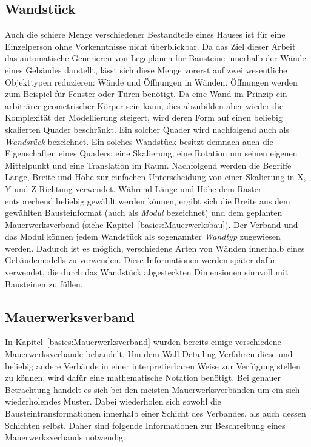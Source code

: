 \subsection{Wandstück}
Auch die schiere Menge verschiedener Bestandteile eines Hauses ist für eine Einzelperson ohne Vorkenntnisse nicht überblickbar.
Da das Ziel dieser Arbeit das automatische Generieren von Legeplänen für Bausteine innerhalb der Wände eines Gebäudes darstellt, lässt sich diese Menge vorerst auf zwei wesentliche Objekttypen reduzieren:
Wände und Öffnungen in Wänden.
Öffnungen werden zum Beispiel für Fenster oder Türen benötigt.
Da eine Wand im Prinzip ein arbiträrer geometrischer Körper sein kann, dies abzubilden aber wieder die Komplexität der Modellierung steigert, wird deren Form auf einen beliebig skalierten Quader beschränkt.
Ein solcher Quader wird nachfolgend auch als \textit{Wandstück} bezeichnet.
Ein solches Wandstück besitzt demnach auch die Eigenschaften eines Quaders: eine Skalierung, eine Rotation um seinen eigenen Mittelpunkt und eine Translation im Raum.
Nachfolgend werden die Begriffe Länge, Breite und Höhe zur einfachen Unterscheidung von einer Skalierung in X, Y und Z Richtung verwendet.
Während Länge und Höhe dem Raster entsprechend beliebig gewählt werden können, ergibt sich die Breite aus dem gewählten Bausteinformat (auch als \textit{Modul} bezeichnet) und dem geplanten Mauerwerksverband (siehe Kapitel~\ref{basics:Mauerwerksbau}).
Der Verband und das Modul können jedem Wandstück als sogenannter \textit{Wandtyp} zugewiesen werden.
Dadurch ist es möglich, verschiedene Arten von Wänden innerhalb eines Gebäudemodells zu verwenden.
Diese Informationen werden später dafür verwendet, die durch das Wandstück abgesteckten Dimensionen sinnvoll mit Bausteinen zu füllen.

\subsection{Mauerwerksverband}\label{concept:mauerwerksverband}
In Kapitel~\ref{basics:Mauerwerksverband} wurden bereits einige verschiedene Mauerwerksverbände behandelt.
Um dem Wall Detailing Verfahren diese und beliebig andere Verbände in einer interpretierbaren Weise zur Verfügung stellen zu können, wird dafür eine mathematische Notation benötigt.
Bei genauer Betrachtung handelt es sich bei den meisten Mauerwerksverbänden um ein sich wiederholendes Muster.
Dabei wiederholen sich sowohl die Bausteintransformationen innerhalb einer Schicht des Verbandes, als auch dessen Schichten selbst.
Daher sind folgende Informationen zur Beschreibung eines Mauerwerksverbands notwendig:

